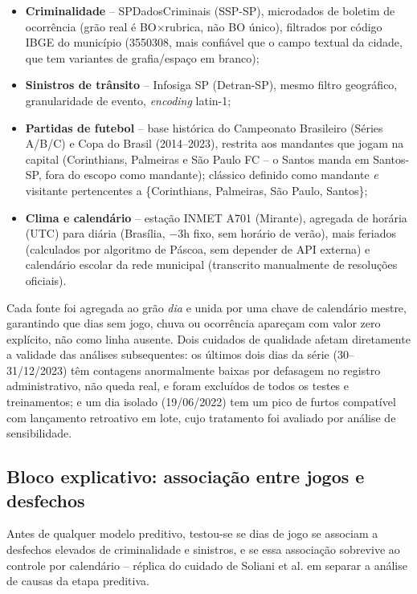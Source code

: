 \begin{itemize}
\item \textbf{Criminalidade} -- SPDadosCriminais (SSP-SP), microdados de
  boletim de ocorrência (grão real é BO$\times$rubrica, não BO único),
  filtrados por código IBGE do município (3550308, mais confiável que o
  campo textual da cidade, que tem variantes de grafia/espaço em branco);
\item \textbf{Sinistros de trânsito} -- Infosiga SP (Detran-SP), mesmo
  filtro geográfico, granularidade de evento, \emph{encoding} latin-1;
\item \textbf{Partidas de futebol} -- base histórica do Campeonato
  Brasileiro (Séries A/B/C) e Copa do Brasil (2014--2023), restrita aos
  mandantes que jogam na capital (Corinthians, Palmeiras e São Paulo FC --
  o Santos manda em Santos-SP, fora do escopo como mandante); clássico
  definido como mandante \emph{e} visitante pertencentes a
  \{Corinthians, Palmeiras, São Paulo, Santos\};
\item \textbf{Clima e calendário} -- estação INMET A701 (Mirante),
  agregada de horária (UTC) para diária (Brasília, $-3$h fixo, sem
  horário de verão), mais feriados (calculados por algoritmo de Páscoa,
  sem depender de API externa) e calendário escolar da rede municipal
  (transcrito manualmente de resoluções oficiais).
\end{itemize}

Cada fonte foi agregada ao grão \emph{dia} e unida por uma chave de
calendário mestre, garantindo que dias sem jogo, chuva ou ocorrência
apareçam com valor zero explícito, não como linha ausente. Dois cuidados
de qualidade afetam diretamente a validade das análises subsequentes:
os últimos dois dias da série (30--31/12/2023) têm contagens anormalmente
baixas por defasagem no registro administrativo, não queda real, e foram
excluídos de todos os testes e treinamentos; e um dia isolado
(19/06/2022) tem um pico de furtos compatível com lançamento retroativo em
lote, cujo tratamento foi avaliado por análise de sensibilidade.

\subsection{Bloco explicativo: associação entre jogos e desfechos}

Antes de qualquer modelo preditivo, testou-se se dias de jogo se associam
a desfechos elevados de criminalidade e sinistros, e se essa associação
sobrevive ao controle por calendário -- réplica do cuidado de Soliani et
al. \cite{soliani2024} em separar a análise de causas da etapa preditiva.


